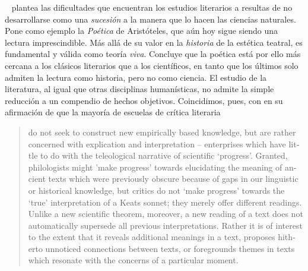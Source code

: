 \citeauthor{garcia2020}~\parencite*[15]{garcia2020} plantea las dificultades que encuentran los estudios literarios a resultas de no desarrollarse como una \textit{sucesión} a la manera que lo hacen las ciencias naturales. Pone como ejemplo la \textit{Poética} de Aristóteles, que aún hoy sigue siendo una lectura imprescindible. Más allá de su valor en la \textit{historia} de la estética teatral, es fundamental y válida como teoría \textit{viva}. Concluye que la poética está por ello más cercana a los clásicos literarios que a los científicos, en tanto que los últimos solo admiten la lectura como historia, pero no como ciencia. El estudio de la literatura, al igual que otras disciplinas humanísticas, no admite la simple reducción a un compendio de hechos objetivos. Coincidimos, pues, con \citeauthor{cameron2011} en su afirmación de que la mayoría de escuelas de crítica literaria 

\blockquote{\begin{english}do not seek to construct new empirically based knowledge, but are rather concerned with explication and interpretation – enterprises which have little to do with the teleological narrative of scientific `progress'. Granted, philologists might 'make progress' towards elucidating the meaning of ancient texts which were previously obscure because of gaps in our linguistic or historical knowledge, but critics do not `make progress' towards the `true' interpretation of a Keats sonnet; they merely offer different readings. Unlike a new scientific theorem, moreover, a new reading of a text does not automatically supersede all previous interpretations. Rather it is of interest to the extent that it reveals additional meanings in a text, proposes hitherto unnoticed connections between texts, or foregrounds themes in texts which resonate with the concerns of a particular moment.\end{english} \parencite[67]{cameron2011}}

